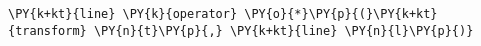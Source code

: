 \begin{Verbatim}[commandchars=\\\{\}]
    \PY{k+kt}{line} \PY{k}{operator} \PY{o}{*}\PY{p}{(}\PY{k+kt}{transform} \PY{n}{t}\PY{p}{,} \PY{k+kt}{line} \PY{n}{l}\PY{p}{)}
\end{Verbatim}
